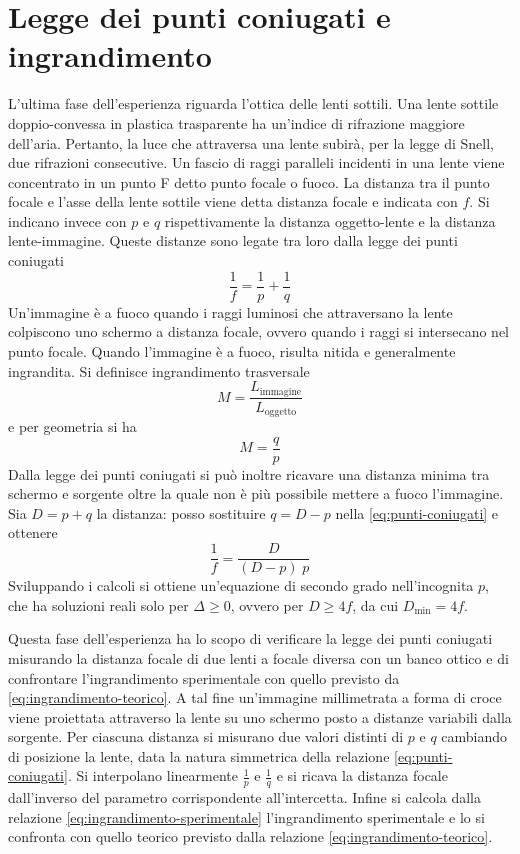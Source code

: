 \section{Legge dei punti coniugati e ingrandimento}
L'ultima fase dell'esperienza riguarda l'ottica delle lenti sottili. Una lente sottile doppio-convessa in plastica trasparente ha un'indice di rifrazione maggiore dell'aria. Pertanto, la luce che attraversa una lente subirà, per la legge di Snell, due rifrazioni consecutive. Un fascio di raggi paralleli incidenti in una lente viene concentrato in un punto F detto punto focale o fuoco. La distanza tra il punto focale e l'asse della lente sottile viene detta distanza focale e indicata con $f$. Si indicano invece con $p$ e $q$ rispettivamente la distanza oggetto-lente e la distanza lente-immagine.
Queste distanze sono legate tra loro dalla legge dei punti coniugati\\
\begin{equation}
    \frac{1}{f} = \frac{1}{p} + \frac{1}{q}
    \label{eq:punti-coniugati}
\end{equation}
Un'immagine è a fuoco quando i raggi luminosi che attraversano la lente colpiscono uno schermo a distanza focale, ovvero quando i raggi si intersecano nel punto focale. Quando l'immagine è a fuoco, risulta nitida e generalmente ingrandita. Si definisce ingrandimento trasversale\\ 
\begin{equation}
    M=\frac{L_{\text{immagine}}}{L_{\text{oggetto}}}
    \label{eq:ingrandimento-sperimentale}
\end{equation}
e per geometria si ha
\begin{equation}
    M=\frac{q}{p}
    \label{eq:ingrandimento-teorico}
\end{equation}
Dalla legge dei punti coniugati si può inoltre ricavare una distanza minima tra schermo e sorgente oltre la quale non è più possibile mettere a fuoco l'immagine. Sia $D=p+q$ la distanza: posso sostituire $q=D-p$ nella \eqref{eq:punti-coniugati} e ottenere $$\frac{1}{f}=\frac{D}{(D-p)\;p}$$
Sviluppando i calcoli si ottiene un'equazione di secondo grado nell'incognita $p$, che ha soluzioni reali solo per $\Delta\geq0$, ovvero per $D \geq 4f$, da cui $D_{\text{min}}=4f \label{distanza-minima}$.

Questa fase dell'esperienza ha lo scopo di verificare la legge dei punti coniugati misurando la distanza focale di due lenti a focale diversa con un banco ottico e di confrontare l'ingrandimento sperimentale con quello previsto da \eqref{eq:ingrandimento-teorico}. A tal fine un'immagine millimetrata a forma di croce viene proiettata attraverso la lente su uno schermo posto a distanze variabili dalla sorgente. Per ciascuna distanza si misurano due valori distinti di  $p$ e $q$ cambiando di posizione la lente, data la natura simmetrica della relazione \eqref{eq:punti-coniugati}. Si interpolano linearmente $\frac{1}{p}$ e $\frac{1}{q}$ e si ricava la distanza focale dall'inverso del parametro corrispondente all'intercetta. Infine si calcola dalla relazione \eqref{eq:ingrandimento-sperimentale} l'ingrandimento sperimentale e lo si confronta con quello teorico previsto dalla relazione \eqref{eq:ingrandimento-teorico}.
